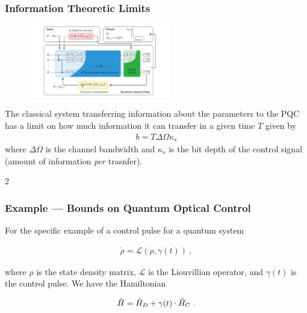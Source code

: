 
\begin{frame}
    \frametitle{Information Theoretic Limits}

    
    \begin{multicols}{2}
        \begin{figure}
            \includegraphics[width=0.55\textwidth]{figures/vqaarch.pdf}
        \end{figure}
        The classical system transferring information about the parameters to
        the PQC has a limit on how much information it can transfer in a given
        time \(T\) given by
        \begin{gather*}
            b = T\Delta\Omega\kappa_s
        \end{gather*}
        where \(\Delta\Omega\) is the channel bandwidth and \(\kappa_s\) is the
        bit depth of the control signal (amount of information \emph{per}
        trasnfer).
    \end{multicols}{2}

\end{frame}

\begin{frame}
    \frametitle{Example --- Bounds on Quantum Optical Control}

    For the specific example of a control pulse for a quantum system

    \begin{gather*}
        \dot{\rho} = \mathcal{L}(\rho, \gamma(t))~,
    \end{gather*}

    where \(\rho\) is the state density matrix, \(\mathcal{L}\) is the
    Liouvillian operator, and \(\gamma(t)\) is the control pulse. We have the
    Hamiltonian

    \begin{gather*}
        \hat{H} = \hat{H}_D + \gamma(t)\cdot \hat{H}_C~.
    \end{gather*}

\end{frame}

